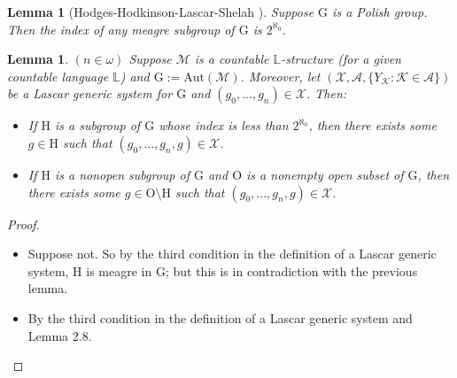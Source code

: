 \documentclass[11pt]{article}
\theoremstyle{plain}
\newtheorem{lem}[theorem]{Lemma}
\theoremstyle{definition}
\newcommand{\M}{\mathcal{M}}
\newcommand{\K}{\mathcal{K}}
\newcommand{\G}{\mathrm{G}}
\newcommand{\A}{\mathrm{Aut}}
\begin{document}
 
 \begin{lem}[Hodges-Hodkinson-Lascar-Shelah \cite{hod}]
Suppose $\G$ is a Polish group. Then the index of any meagre subgroup of $\G$ is $2^{\aleph_{0}}$.
 \end{lem}
 
 \begin{lem}
 $(n\in\omega)$	Suppose $\M$ is a countable $\mathbb{L}$-structure (for a given countable language $\mathbb{L}$) and $\G:=\A(\M)$. Moreover, let  $(\mathcal{X},\mathcal{A},\{Y_{\K}: \K\in\mathcal{A}\})$ be a Lascar generic system for $\G$ and $(g_{0},...,g_{n})\in\mathcal{X}$. Then:
 \begin{itemize}
\item[(1)] If   $\mathrm{H}$ is a subgroup of $\G$ whose index is less than $2^{\aleph_{0}}$, then there exists some $g\in \mathrm{H}$ such that $(g_{0},...,g_{n},g)\in\mathcal{X}$.
\item[(2)] If $\mathrm{H}$ is a nonopen subgroup of $\G$ and  $ \mathrm{O}$ is a nonempty open subset of $\G$, then there exists some $g\in \mathrm{O}\setminus \mathrm{H}$ such that $(g_{0},...,g_{n},g)\in\mathcal{X}$.
 \end{itemize}
 \end{lem}
 \begin{proof}
 	\begin{itemize}
 	\item[(1)]  Suppose not. So by the third condition in the definition of a Lascar generic system, $\mathrm{H}$ is meagre in $\G$; but this is in contradiction with the previous lemma.
 	\item[(2)] By the third condition in the definition of a Lascar generic system and Lemma 2.8. 
 	\end{itemize}
\end{proof}
\end{document}
